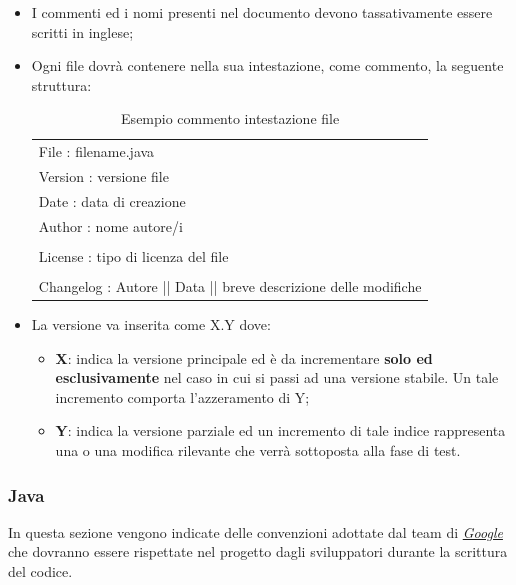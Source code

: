 \begin{itemize}
	\item I commenti ed i nomi presenti nel documento devono tassativamente essere scritti in inglese;
	\item Ogni file dovrà contenere nella sua intestazione, come commento, la seguente struttura:
\begin{table} [H]
	\begin{center}
		\begin{tabular}{| l |}
			\hline
			File : filename.java\\
			Version : versione file\\
			Date : data di creazione\\
			Author : nome autore/i\\
			\\
			License : tipo di licenza del file\\
			\\
			Changelog : Autore || Data || breve descrizione delle modifiche\\
			\hline
		\end{tabular}
	\end{center}
	\caption{Esempio commento intestazione file}
\end{table}
\end{itemize}

\begin{itemize}
	\item La versione va inserita come X.Y dove:
	\begin{itemize}
		\item \textbf{X}: indica la versione principale ed è da incrementare \textbf{solo ed esclusivamente} nel caso in cui si passi ad una versione stabile. Un tale incremento comporta l’azzeramento di Y;
		\item \textbf{Y}: indica la versione parziale ed un incremento di tale indice rappresenta una  o una modifica rilevante che verrà sottoposta alla fase di test.
	\end{itemize}
\end{itemize}
\subsubsection{Java}
In questa sezione vengono indicate delle convenzioni adottate dal team di 
\href{https://google.github.io/styleguide/javaguide.html}\emph{Google} che dovranno essere rispettate nel progetto dagli sviluppatori durante la scrittura del codice.
